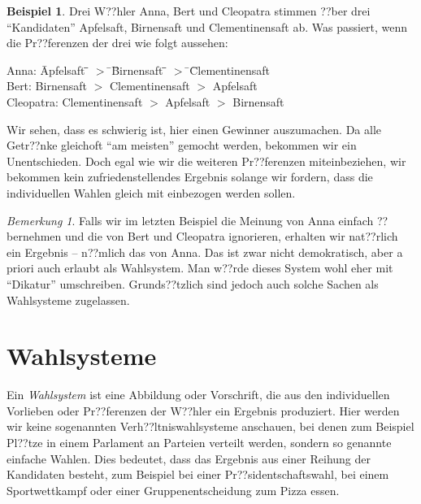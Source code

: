 \documentclass{zirkelblatt1415}
\theoremstyle{definition}
\theoremstyle{definition}
\newtheorem*{beispiel}{Beispiel}
\theoremstyle{definition}
\theoremstyle{definition}
\theoremstyle{remark}
\newtheorem*{rmk}{Bemerkung}
\begin{document}
\begin{beispiel}
  Drei W??hler Anna, Bert und Cleopatra stimmen ??ber drei "`Kandidaten"' Apfelsaft, Birnensaft und Clementinensaft ab. Was passiert, wenn die Pr??ferenzen der drei wie folgt aussehen:
  \begin{tabbing}
    Anna: \qquad \quad\= Apfelsaft \= \qquad \quad \= $>$ \= \qquad \quad \=  Birnensaft \= \qquad \quad \= $>$ \= \qquad \quad \= Clementinensaft \\
    Bert: \> Birnensaft \> \> $>$ \> \> Clementinensaft \> \> $>$ \> \> Apfelsaft \\
    Cleopatra: \> Clementinensaft \> \> $>$ \> \> Apfelsaft \> \> $>$ \> \> Birnensaft \\
  \end{tabbing}
Wir sehen, dass es schwierig ist, hier einen Gewinner auszumachen. Da alle Getr??nke gleichoft "`am meisten"' gemocht werden, bekommen wir ein Unentschieden. Doch egal wie wir die weiteren Pr??ferenzen miteinbeziehen, wir bekommen kein zufriedenstellendes Ergebnis solange wir fordern, dass die individuellen Wahlen gleich mit einbezogen werden sollen.
\end{beispiel}

\begin{rmk}
  Falls wir im letzten Beispiel die Meinung von Anna einfach ??bernehmen und die von Bert und Cleopatra ignorieren, erhalten wir nat??rlich ein Ergebnis -- n??mlich das von Anna. Das ist zwar nicht demokratisch, aber a priori auch erlaubt als Wahlsystem. Man w??rde dieses System wohl eher mit "`Dikatur"' umschreiben. Grunds??tzlich sind jedoch auch solche Sachen als Wahlsysteme zugelassen.
\end{rmk}


\section{Wahlsysteme}

Ein \emph{Wahlsystem} ist eine Abbildung oder Vorschrift, die aus den individuellen Vorlieben oder Pr??ferenzen der W??hler ein Ergebnis produziert. Hier werden wir keine sogenannten Verh??ltniswahlsysteme anschauen, bei denen zum Beispiel Pl??tze in einem Parlament an Parteien verteilt werden, sondern so genannte einfache Wahlen. Dies bedeutet, dass das Ergebnis aus einer Reihung der Kandidaten besteht, zum Beispiel bei einer Pr??sidentschaftswahl, bei einem Sportwettkampf oder einer Gruppenentscheidung zum Pizza essen.
\end{document}
